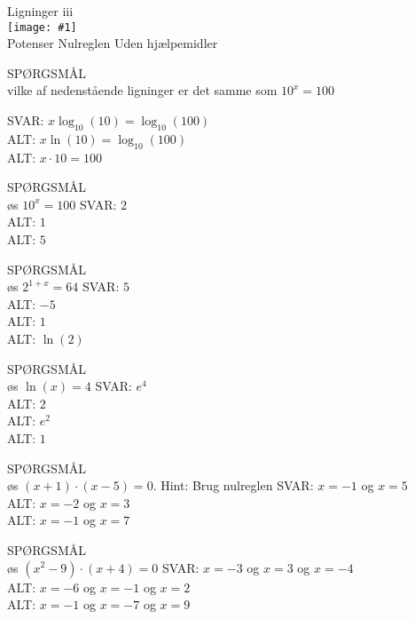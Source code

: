 \documentclass[]{article}
\newcounter{spgcounter}
\newenvironment{question}[2]{\addtocounter{spgcounter}{1} SPØRGSMÅL \thespgcounter\\}{\hspace{50px}}
\newcommand{\name}[1]{{\huge #1}\\}
\newcommand{\tag}[1]{#1}
\newcommand{\cover}[1]{\texttt{[image: \#1]}\\}
\newcommand{\answer}[1]{{\color{green} SVAR: #1}\\}
\newcommand{\alt}[1]{{\color{red} ALT: #1}\\}
\begin{document}
\name{Ligninger iii}
\cover{eksponotielligninger.png}
\tag{Potenser}
\tag{Nulreglen}
\tag{Uden hjælpemidler}

\begin{question}{multi}
    Hvilke af nedenstående ligninger er det samme som $10^x = 100$
    
    \answer{$x \log_{10}{(10)} = \log_{10}{(100)}$}
    \alt{$x \ln{(10)} = \log_{10}{(100)}$}
    \alt{$x \cdot 10 = 100$}
    \end{question}
    
    \begin{question}{multi}
    Løs $10^x = 100$
    \answer{$2$}
    \alt{$1$}
    \alt{$5$}
    \end{question}
    
    \begin{question}{multi}
    Løs $2^{1+x} = 64$
    \answer{$5$}
    \alt{$-5$}
    \alt{$1$}
    \alt{$\ln{(2)}$}
    \end{question}
    
    \begin{question}{multi}
    Løs $\ln{(x)}=4$
    \answer{$e^4$}
    \alt{$2$}
    \alt{$e^2$}
    \alt{$1$}
    \end{question}
    
    \begin{question}{multi}
    Løs $(x+1)\cdot (x-5)=0$. Hint: Brug nulreglen
    \answer{$x=-1$ og $x=5$}
    \alt{$x=-2$ og $x=3$}
    \alt{$x=-1$ og $x=7$}
    \end{question}
    
    \begin{question}{multi}
    Løs $(x^2-9)\cdot (x+4)=0$
    \answer{$x=-3$ og $x=3$ og $x=-4$}
    \alt{$x=-6$ og $x=-1$ og $x=2$}
    \alt{$x=-1$ og $x=-7$ og $x=9$}
    \end{question}
    
\end{document}
